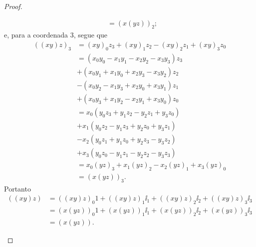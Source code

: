 \begin{proof}
\begin{itemize}
\begin{align*}
			&= (x(yz))_2;
		\end{align*}
	e, para a coordenada $3$, segue que
		\begin{align*}
		((xy)z)_3 &= (xy)_0z_3 + (xy)_1z_2 - (xy)_2z_1 + (xy)_3z_0 \\
			&= (x_0y_0 - x_1y_1 - x_2y_2 - x_3y_3)z_3 \\
			&+ (x_0y_1 + x_1y_0 + x_2y_3 - x_3y_2)z_2 \\
			&- (x_0y_2 - x_1y_3 + x_2y_0 + x_3y_1)z_1 \\
			&+ (x_0y_3 + x_1y_2 - x_2y_1 + x_3y_0)z_0 \\
			&= x_0(y_0z_3 + y_1z_2 - y_2z_1 + y_3z_0) \\
			&+ x_1(y_0z_2 - y_1z_3 + y_2z_0 + y_3z_1) \\
			&- x_2(y_0z_1 + y_1z_0 + y_2z_3 - y_3z_2) \\
			&+ x_3(y_0z_0 - y_1z_1 - y_2z_2 - y_3z_3) \\
			&= x_0(yz)_3 + x_1(yz)_2 - x_2(yz)_1 + x_3(yz)_0 \\
			&= (x(yz))_3.
		\end{align*}
	Portanto
		\begin{align*}
		((xy)z) &= ((xy)z)_0 1 + ((xy)z)_1 \ii_1 + ((xy)z)_2 \ii_2 + ((xy)z)_3 \ii_3 \\
			&= (x(yz))_0 1 + (x(yz))_1 \ii_1 + (x(yz))_2 \ii_2 + (x(yz))_3 \ii_3 \\
			&= (x(yz)).
		\end{align*}


\end{itemize}
\end{proof}
